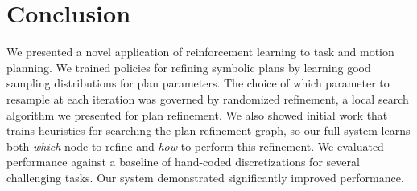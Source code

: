\section{Conclusion}
We presented a novel application of reinforcement learning to task
and motion planning. We trained policies for refining symbolic plans
by learning good sampling distributions for plan parameters. The choice
of which parameter to resample at each iteration was governed by randomized refinement,
a local search algorithm we presented for plan refinement. We also showed initial work that trains heuristics
for searching the plan refinement graph, so our full system learns both \emph{which} node to refine
and \emph{how} to perform this refinement. We evaluated performance against a baseline
of hand-coded discretizations for several challenging tasks. Our system demonstrated
significantly improved performance.
